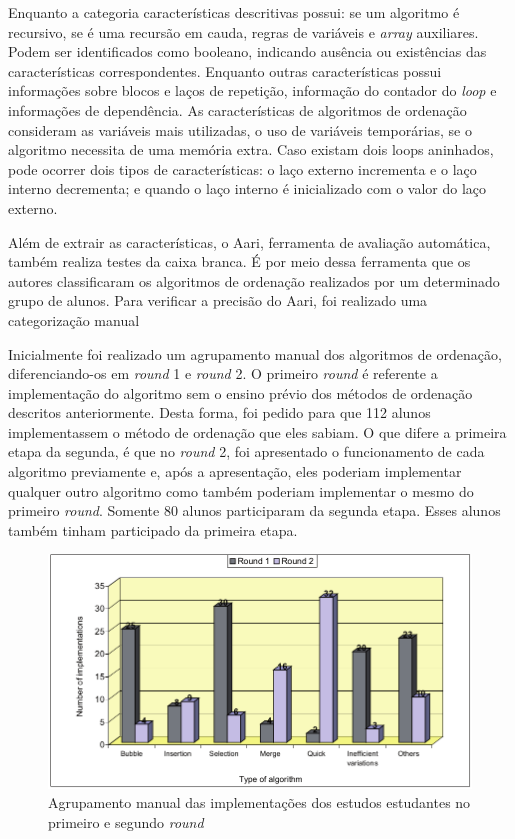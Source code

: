     Enquanto a categoria características descritivas possui: se um algoritmo é
    recursivo, se é uma recursão em cauda, regras de variáveis e \textit{array}
    auxiliares. Podem ser identificados como booleano, indicando ausência ou
    existências das características correspondentes. Enquanto outras características
    possui informações sobre blocos e laços de repetição, informação do contador do
    \textit{loop} e informações de dependência. As características de algoritmos de
    ordenação consideram as variáveis mais utilizadas, o uso de variáveis temporárias,
    se o algoritmo necessita de uma memória extra. Caso existam dois loops aninhados,
    pode ocorrer dois tipos de características: o laço externo incrementa e o laço
    interno decrementa; e quando o laço interno é inicializado com o valor do laço
    externo. 
    
    Além de extrair as características, o Aari, ferramenta de avaliação automática,
    também realiza testes da caixa branca. É por meio dessa ferramenta que os
    autores classificaram os algoritmos de ordenação realizados por um determinado
    grupo de alunos. Para verificar a precisão do Aari, foi realizado uma
    categorização manual
    
    Inicialmente foi realizado um agrupamento manual dos algoritmos de ordenação,
    diferenciando-os em \textit{round} 1 e \textit{round} 2. O primeiro
    \textit{round} é referente a implementação do algoritmo sem o ensino
    prévio dos métodos de ordenação descritos anteriormente. Desta forma,
    foi pedido para que 112 alunos implementassem o método de ordenação que
    eles sabiam. O que difere a primeira etapa da segunda, é que no \textit{round}
    2, foi apresentado o funcionamento de cada algoritmo previamente e, após a
    apresentação, eles poderiam implementar qualquer outro algoritmo como também
    poderiam implementar o mesmo do primeiro \textit{round}. Somente 80 alunos
    participaram da segunda etapa. Esses alunos também tinham participado da
    primeira etapa.
    
    \begin{figure}[h]
        \centering
        \includegraphics[scale=0.4]{imagem/clusterManual.png}
        \caption{Agrupamento manual das implementações dos estudos estudantes no
        	primeiro e segundo \textit{round}}
        \label{fig:clusterManual}
    \end{figure}
    
